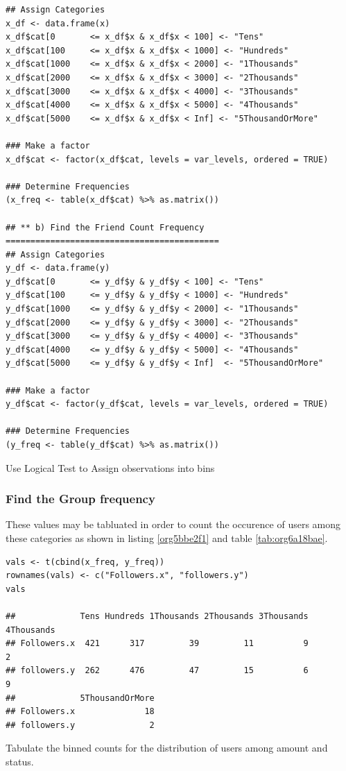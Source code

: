 \documentclass[11pt]{article}
\begin{document}
\begin{listing}[htbp]
\begin{verbatim}
## Assign Categories
x_df <- data.frame(x)
x_df$cat[0       <= x_df$x & x_df$x < 100] <- "Tens"
x_df$cat[100     <= x_df$x & x_df$x < 1000] <- "Hundreds"
x_df$cat[1000    <= x_df$x & x_df$x < 2000] <- "1Thousands"
x_df$cat[2000    <= x_df$x & x_df$x < 3000] <- "2Thousands"
x_df$cat[3000    <= x_df$x & x_df$x < 4000] <- "3Thousands"
x_df$cat[4000    <= x_df$x & x_df$x < 5000] <- "4Thousands"
x_df$cat[5000    <= x_df$x & x_df$x < Inf] <- "5ThousandOrMore"

### Make a factor
x_df$cat <- factor(x_df$cat, levels = var_levels, ordered = TRUE)

### Determine Frequencies
(x_freq <- table(x_df$cat) %>% as.matrix())

## ** b) Find the Friend Count Frequency ===========================================
## Assign Categories
y_df <- data.frame(y)
y_df$cat[0       <= y_df$y & y_df$y < 100] <- "Tens"
y_df$cat[100     <= y_df$y & y_df$y < 1000] <- "Hundreds"
y_df$cat[1000    <= y_df$y & y_df$y < 2000] <- "1Thousands"
y_df$cat[2000    <= y_df$y & y_df$y < 3000] <- "2Thousands"
y_df$cat[3000    <= y_df$y & y_df$y < 4000] <- "3Thousands"
y_df$cat[4000    <= y_df$y & y_df$y < 5000] <- "4Thousands"
y_df$cat[5000    <= y_df$y & y_df$y < Inf]  <- "5ThousandOrMore"

### Make a factor
y_df$cat <- factor(y_df$cat, levels = var_levels, ordered = TRUE)

### Determine Frequencies
(y_freq <- table(y_df$cat) %>% as.matrix())
\end{verbatim}
\caption{\label{org08465e9}Use Logical Test to Assign observations into bins}
\end{listing}

\subsubsection{Find the Group frequency}
\label{sec:orgf226b11}
These values may be tabluated in order to count the occurence of users among these categories as shown in listing \ref{org5bbe2f1} and table \ref{tab:org6a18bae}.

\begin{listing}[htbp]
\begin{verbatim}
vals <- t(cbind(x_freq, y_freq))
rownames(vals) <- c("Followers.x", "followers.y")
vals

##             Tens Hundreds 1Thousands 2Thousands 3Thousands 4Thousands
## Followers.x  421      317         39         11          9          2
## followers.y  262      476         47         15          6          9
##             5ThousandOrMore
## Followers.x              18
## followers.y               2
\end{verbatim}
\caption{\label{org5bbe2f1}Tabulate the binned counts for the distribution of users among amount and status.}
\end{listing}
\end{document}
